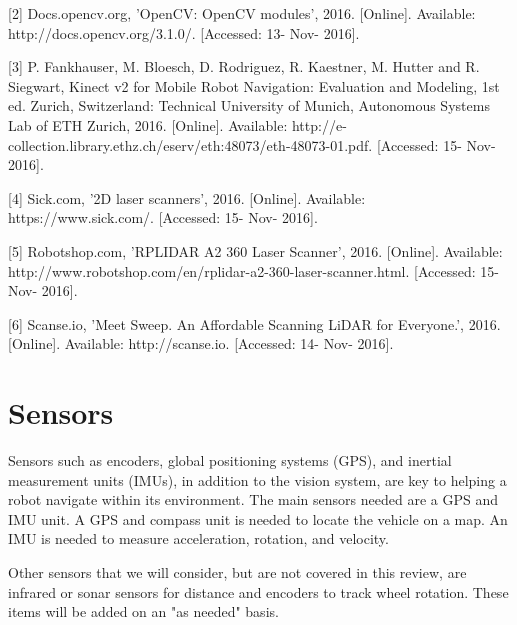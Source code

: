 \documentclass[compsoc,draftclsnofoot,onecolumn,10pt]{IEEEtran}
\begin{document}
[2] Docs.opencv.org, 'OpenCV: OpenCV modules',  2016. [Online]. Available: http://docs.opencv.org/3.1.0/. [Accessed: 13- Nov- 2016]. \par

[3] P. Fankhauser, M. Bloesch, D. Rodriguez, R. Kaestner, M. Hutter and R. Siegwart, Kinect v2 for Mobile Robot Navigation: Evaluation and Modeling, 1st ed. Zurich, Switzerland: Technical University of Munich, Autonomous Systems Lab of ETH Zurich, 2016. [Online]. Available: http://e-collection.library.ethz.ch/eserv/eth:48073/eth-48073-01.pdf. [Accessed: 15- Nov- 2016]. \par

[4] Sick.com, '2D laser scanners',  2016. [Online]. Available: https://www.sick.com/. [Accessed: 15- Nov- 2016]. \par

[5] Robotshop.com, 'RPLIDAR A2 360 Laser Scanner',  2016. [Online]. Available: http://www.robotshop.com/en/rplidar-a2-360-laser-scanner.html. [Accessed: 15- Nov- 2016]. \par

[6] Scanse.io, 'Meet Sweep. An Affordable Scanning LiDAR for Everyone.',  2016. [Online]. Available: http://scanse.io. [Accessed: 14- Nov- 2016]. \par

\newpage

\section{Sensors}
Sensors such as encoders, global positioning systems (GPS), and inertial measurement units (IMUs), in addition to the vision system, are key to helping a robot navigate within its environment. 
The main sensors needed are a GPS and IMU unit. 
A GPS and compass unit is needed to locate the vehicle on a map. 
An IMU is needed to measure acceleration, rotation, and velocity. \par
Other sensors that we will consider, but are not covered in this review, are infrared or sonar sensors for distance and encoders to track wheel rotation. These items will be added on an "as needed" basis. 
\end{document}
